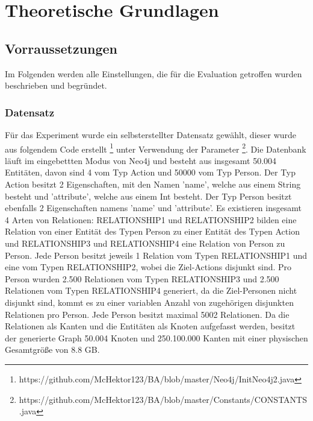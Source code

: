 
\chapter{Theoretische Grundlagen} %

\label{Kaptiel3} %

\section{Vorraussetzungen}
Im Folgenden werden alle Einstellungen, die für die Evaluation getroffen wurden beschrieben und begründet. 
\subsection{Datensatz}
Für das Experiment wurde ein selbsterstellter Datensatz gewählt, dieser wurde aus folgendem Code erstellt \footnote{https://github.com/McHektor123/BA/blob/master/Neo4j/InitNeo4j2.java} unter Verwendung der Parameter \footnote{https://github.com/McHektor123/BA/blob/master/Constants/CONSTANTS.java}. Die Datenbank läuft im eingebettten Modus von Neo4j und besteht aus insgesamt 50.004 Entitäten, davon sind 4  vom Typ Action und  50000  vom Typ Person. Der Typ Action besitzt  2 Eigenschaften, mit den Namen 'name', welche aus einem String besteht  und 'attribute', welche aus einem Int besteht. Der Typ Person besitzt ebenfalls 2 Eigenschaften namens 'name' und 'attribute'. \newline
Es existieren insgesamt 4 Arten von Relationen: RELATIONSHIP1 und RELATIONSHIP2 bilden eine Relation von einer Entität des Typen Person zu einer Entität des Typen Action  und  RELATIONSHIP3 und RELATIONSHIP4 eine Relation von Person zu Person. Jede Person besitzt jeweils 1 Relation vom Typen RELATIONSHIP1 und eine vom Typen RELATIONSHIP2, wobei die Ziel-Actions disjunkt sind. Pro Person wurden 2.500 Relationen vom Typen RELATIONSHIP3 und 2.500 Relationen vom Typen RELATIONSHIP4 generiert, da die Ziel-Personen nicht disjunkt sind, kommt es zu einer variablen Anzahl von zugehörigen disjunkten Relationen pro Person. Jede Person besitzt maximal 5002 Relationen. Da die Relationen als Kanten und die Entitäten als Knoten aufgefasst werden, besitzt der generierte Graph 50.004 Knoten und 250.100.000 Kanten mit einer physischen Gesamtgröße von 8.8 GB. 
